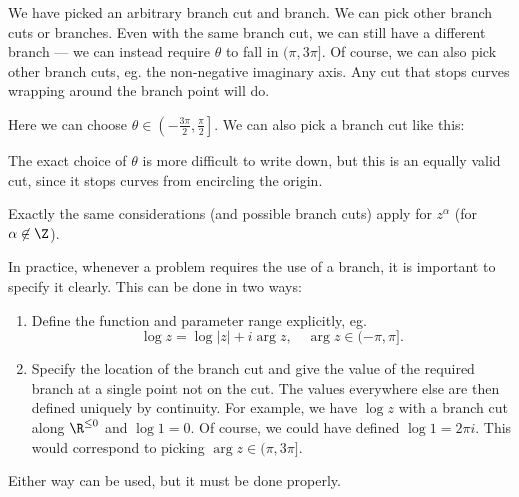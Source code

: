 \documentclass[a4paper]{article}
\begin{document}
We have picked an arbitrary branch cut and branch. We can pick other branch cuts or branches. Even with the same branch cut, we can still have a different branch --- we can instead require $\theta$ to fall in $(\pi, 3\pi]$. Of course, we can also pick other branch cuts, eg. the non-negative imaginary axis. Any cut that stops curves wrapping around the branch point will do.
\begin{center}
\end{center}
Here we can choose $\theta \in \left(-\frac{3\pi}{2}, \frac{\pi}{2}\right]$. We can also pick a branch cut like this:
\begin{center}
\end{center}
The exact choice of $\theta$ is more difficult to write down, but this is an equally valid cut, since it stops curves from encircling the origin.

Exactly the same considerations (and possible branch cuts) apply for $z^\alpha$ (for $\alpha \not\in \Z$).

In practice, whenever a problem requires the use of a branch, it is important to specify it clearly. This can be done in two ways:
\begin{enumerate}
  \item Define the function and parameter range explicitly, eg.
    \[
      \log z = \log|z| + i \arg z, \quad \arg z \in (-\pi, \pi].
    \]
  \item Specify the location of the branch cut and give the value of the required branch at a single point not on the cut. The values everywhere else are then defined uniquely by continuity. For example, we have $\log z$ with a branch cut along $\R^{\leq 0}$ and $\log 1 = 0$. Of course, we could have defined $\log 1 = 2\pi i$. This would correspond to picking $\arg z \in (\pi, 3 \pi]$.
\end{enumerate}
Either way can be used, but it must be done properly.
\end{document}
